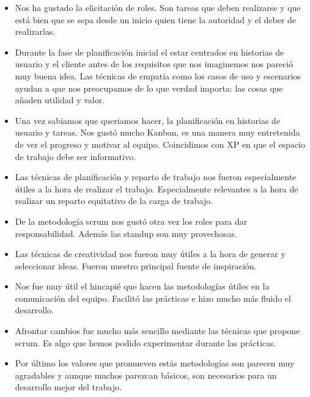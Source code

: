 \documentclass[11pt,a4paper]{article}
\begin{document}
\begin{itemize}
    \item Nos ha gustado la elicitación de roles. Son tareas que deben realizarse y que está bien que se sepa desde un inicio quien tiene la autoridad y el deber de realizarlas.

	\item Durante la fase de planificación inicial el estar centrados en historias de usuario y el cliente antes de los requisitos que nos imaginemos nos pareció muy buena idea. Las técnicas de empatía como los casos de uso y escenarios ayudan a que nos preocupamos de lo que verdad importa: las cosas que añaden utilidad y valor.
	
    \item Una vez sabiamos que queriamos hacer, la planificación en historias de usuario y tareas. Nos gustó mucho Kanban, es una manera muy entretenida de ver el progreso y motivar al equipo. Coincidimos con XP en que el espacio de trabajo debe ser informativo. 
    
    \item Las técnicas de planificación y reparto de trabajo nos fueron especialmente útiles a la hora de realizar el trabajo. Especialmente relevantes a la hora de realizar un reparto equitativo de la carga de trabajo.
    
    \item De la metodología scrum nos gustó otra vez los roles para dar responsabilidad. Además las standup son muy provechosas.
    
    \item Las técnicas de creatividad nos fueron muy útiles a la hora de generar y seleccionar ideas. Fueron nuestro principal fuente de inspiración.
    
    \item Nos fue muy útil el hincapié que hacen las metodologías útiles en la comunicación del equipo. Facilitó las prácticas e hizo mucho más fluido el desarrollo.
    
    \item Afrontar cambios fue mucho más sencillo mediante las técnicas que propone scrum. Es algo que hemos podido experimentar durante las prácticas.
    
    \item Por último los valores que promueven estás metodologías son parecen muy agradables y aunque muchos parezcan básicos, son necesarios para un desarrollo mejor del trabajo.
\end{itemize}
\end{document}
